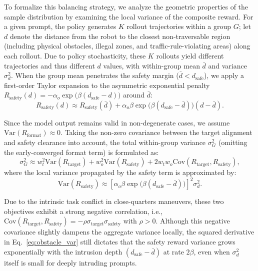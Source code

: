 To formalize this balancing strategy, we analyze the geometric properties of the sample distribution by examining the local variance of the composite reward. For a given prompt, the policy generates $K$ rollout trajectories within a group $G$; let $d$ denote the distance from the robot to the closest non-traversable region (including physical obstacles, illegal zones, and traffic-rule-violating areas) along each rollout. Due to policy stochasticity, these $K$ rollouts yield different trajectories and thus different $d$ values, with within-group mean $\bar{d}$ and variance $\sigma_d^2$. When the group mean penetrates the safety margin ($\bar{d} < d_{\mathrm{safe}}$), we apply a first-order Taylor expansion to the asymmetric exponential penalty $R_{\mathrm{safety}}(d) = -\alpha_o \exp\bigl(\beta(d_{\mathrm{safe}}-d)\bigr)$ around $\bar{d}$:
\begin{equation}
    R_{\mathrm{safety}}(d) \approx R_{\mathrm{safety}}(\bar{d}) + \alpha_o \beta \exp\bigl(\beta(d_{\mathrm{safe}}-\bar{d})\bigr) (d - \bar{d}).
\end{equation}

Since the model output remains valid in non-degenerate cases, we assume $\mathrm{Var}(R_{\mathrm{format}}) \approx 0$. Taking the non-zero covariance between the target alignment and safety clearance into account, the total within-group variance $\sigma_G^2$ (omitting the early-converged format term) is formulated as:
\begin{equation}
    \sigma_G^2 \approx w_t^2 \mathrm{Var}(R_{\mathrm{target}}) + w_o^2 \mathrm{Var}(R_{\mathrm{safety}}) + 2w_t w_o \mathrm{Cov}(R_{\mathrm{target}}, R_{\mathrm{safety}}),
    \label{eq:total_var}
\end{equation}
where the local variance propagated by the safety term is approximated by:
\begin{equation}
    \mathrm{Var}(R_{\mathrm{safety}}) \approx \left[ \alpha_o \beta \exp\bigl(\beta(d_{\mathrm{safe}}-\bar{d})\bigr) \right]^2 \sigma_d^2.
    \label{eq:obstacle_var}
\end{equation}

Due to the intrinsic task conflict in close-quarters maneuvers, these two objectives exhibit a strong negative correlation, i.e., $\mathrm{Cov}(R_{\mathrm{target}}, R_{\mathrm{safety}}) = -\rho \sigma_{\mathrm{target}}\sigma_{\mathrm{safety}}$ with $\rho > 0$. Although this negative covariance slightly dampens the aggregate variance locally, the squared derivative in Eq.~\eqref{eq:obstacle_var} still dictates that the safety reward variance grows exponentially with the intrusion depth $(d_{\mathrm{safe}}-\bar{d})$ at rate $2\beta$, even when $\sigma_d^2$ itself is small for deeply intruding prompts.

